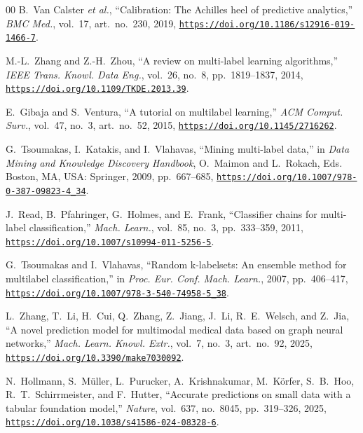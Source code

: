 \documentclass{ieeeaccess}
\begin{document}
\begin{thebibliography}{00}
B.~Van Calster \emph{et al.}, ``Calibration: The Achilles heel of predictive analytics,'' \emph{BMC Med.}, vol.~17, art.~no.~230, 2019, \href{https://doi.org/10.1186/s12916-019-1466-7}{\nolinkurl{https://doi.org/10.1186/s12916-019-1466-7}}.

M.-L.~Zhang and Z.-H.~Zhou, ``A review on multi-label learning algorithms,'' \emph{IEEE Trans. Knowl. Data Eng.}, vol.~26, no.~8, pp.~1819--1837, 2014, \href{https://doi.org/10.1109/TKDE.2013.39}{\nolinkurl{https://doi.org/10.1109/TKDE.2013.39}}.

E.~Gibaja and S.~Ventura, ``A tutorial on multilabel learning,'' \emph{ACM Comput. Surv.}, vol.~47, no.~3, art.~no.~52, 2015, \href{https://doi.org/10.1145/2716262}{\nolinkurl{https://doi.org/10.1145/2716262}}.

G.~Tsoumakas, I.~Katakis, and I.~Vlahavas, ``Mining multi-label data,'' in \emph{Data Mining and Knowledge Discovery Handbook}, O.~Maimon and L.~Rokach, Eds. Boston, MA, USA: Springer, 2009, pp.~667--685, \href{https://doi.org/10.1007/978-0-387-09823-4_34}{\nolinkurl{https://doi.org/10.1007/978-0-387-09823-4_34}}.

J.~Read, B.~Pfahringer, G.~Holmes, and E.~Frank, ``Classifier chains for multi-label classification,'' \emph{Mach. Learn.}, vol.~85, no.~3, pp.~333--359, 2011, \href{https://doi.org/10.1007/s10994-011-5256-5}{\nolinkurl{https://doi.org/10.1007/s10994-011-5256-5}}.

G.~Tsoumakas and I.~Vlahavas, ``Random k-labelsets: An ensemble method for multilabel classification,'' in \emph{Proc. Eur. Conf. Mach. Learn.}, 2007, pp.~406--417, \href{https://doi.org/10.1007/978-3-540-74958-5_38}{\nolinkurl{https://doi.org/10.1007/978-3-540-74958-5_38}}.

L.~Zhang, T.~Li, H.~Cui, Q.~Zhang, Z.~Jiang, J.~Li, R.~E.~Welsch, and Z.~Jia, ``A novel prediction model for multimodal medical data based on graph neural networks,'' \emph{Mach. Learn. Knowl. Extr.}, vol.~7, no.~3, art.~no.~92, 2025, \href{https://doi.org/10.3390/make7030092}{\nolinkurl{https://doi.org/10.3390/make7030092}}.

N.~Hollmann, S.~M\"{u}ller, L.~Purucker, A.~Krishnakumar, M.~K\"{o}rfer, S.~B.~Hoo, R.~T.~Schirrmeister, and F.~Hutter, ``Accurate predictions on small data with a tabular foundation model,'' \emph{Nature}, vol.~637, no.~8045, pp.~319--326, 2025, \href{https://doi.org/10.1038/s41586-024-08328-6}{\nolinkurl{https://doi.org/10.1038/s41586-024-08328-6}}.


\end{thebibliography}
\end{document}
